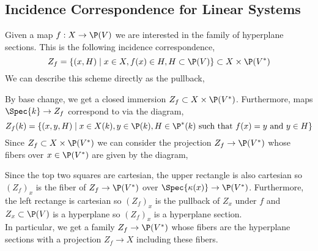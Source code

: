 \documentclass[12pt]{article}
\begin{document}
\subsection{Incidence Correspondence for Linear Systems}

Given a map $f : X \to \P(V)$ we are interested in the family of hyperplane sections. This is the following incidence correspondence,
\[ Z_f = \{ (x, H) \mid x \in X, f(x) \in H, H \subset \P(V) \} \subset X \times \P(V^*) \]
We can describe this scheme directly as the pullback,
\begin{center}
\end{center}
By base change, we get a closed immersion $Z_f \subset X \times \P(V^*)$. Furthermore, maps $\Spec{k} \to Z_f$ correspond to via the diagram,
\[ Z_f(k) = \{ (x,y,H) \mid x \in X(k), y \in \P(k), H \in \P^*(k) \text{ such that } f(x) = y \text{ and } y \in H \} \] 
Since $Z_f \subset X \times \P(V^*)$ we can consider the projection $Z_f \to \P(V^*)$ whose fibers over $x \in \P(V^*)$ are given by the diagram, 
\begin{center}
\end{center}
Since the top two squares are cartesian, the upper rectangle is also cartesian so $(Z_f)_x$ is the fiber of $Z_f \to \P(V^*)$ over $\Spec{\kappa(x)} \to \P(V^*)$. Furthermore, the left rectange is cartesian so $(Z_f)_x$ is the pullback of $Z_x$ under $f$ and $Z_x \subset \P(V)$ is a hyperplane so $(Z_f)_x$ is a hyperplane section.
\bigskip\\
In particular, we get a family $Z_f \to \P(V^*)$ whose fibers are the hyperplane sections with a projection $Z_f \to X$ including these fibers. 
\end{document}
